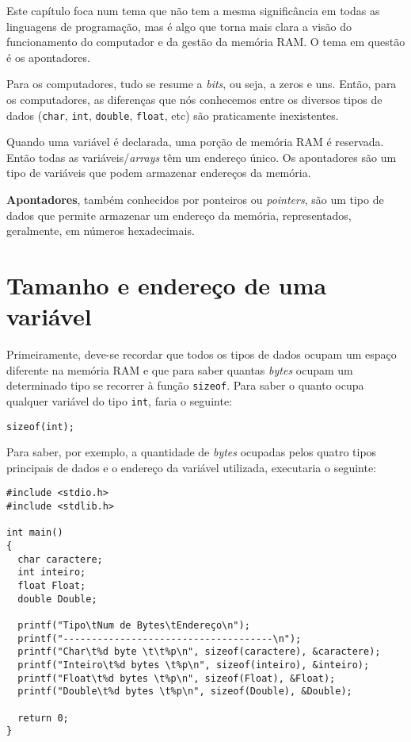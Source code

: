 Este capítulo foca num tema que não tem a mesma significância em todas as linguagens de programação, mas é algo que torna mais clara a visão do funcionamento do computador e da gestão da memória RAM. O tema em questão é os apontadores.

Para os computadores, tudo se resume a \textit{bits}, ou seja, a zeros e uns. Então, para os computadores, as diferenças que nós conhecemos entre os diversos tipos de dados (\texttt{char}, \texttt{int}, \texttt{double}, \texttt{float}, etc) são praticamente inexistentes.

Quando uma variável é declarada, uma porção de memória RAM é reservada. Então todas as variáveis/\textit{arrays} têm um endereço único. Os apontadores são um tipo de variáveis que podem armazenar endereços da memória.

\begin{defi}
\textbf{Apontadores}, também conhecidos por ponteiros ou \textit{pointers}, são um tipo de dados que permite armazenar um endereço da memória, representados, geralmente, em números hexadecimais.
\end{defi}

\section{Tamanho e endereço de uma variável}

Primeiramente, deve-se recordar que todos os tipos de dados ocupam um espaço diferente na memória RAM e que para saber quantas \textit{bytes} ocupam um determinado tipo se recorrer à função \texttt{sizeof}. Para saber o quanto ocupa qualquer variável do tipo \texttt{int}, faria o seguinte:

\begin{lstlisting}
sizeof(int);
\end{lstlisting}

Para saber, por exemplo, a quantidade de \textit{bytes} ocupadas pelos quatro tipos principais de dados e o endereço da variável utilizada, executaria o seguinte:

\begin{lstlisting}
#include <stdio.h>
#include <stdlib.h>
 
int main()
{
  char caractere;
  int inteiro;
  float Float;
  double Double;
 
  printf("Tipo\tNum de Bytes\tEndereço\n");
  printf("-------------------------------------\n");
  printf("Char\t%d byte \t\t%p\n", sizeof(caractere), &caractere);
  printf("Inteiro\t%d bytes \t%p\n", sizeof(inteiro), &inteiro);
  printf("Float\t%d bytes \t%p\n", sizeof(Float), &Float);
  printf("Double\t%d bytes \t%p\n", sizeof(Double), &Double);
 
  return 0;
}
\end{lstlisting}

